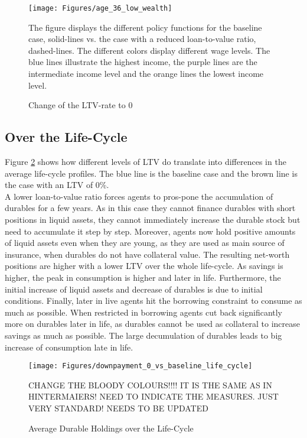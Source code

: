 \documentclass[a4paper,12pt,legno]{article}
\begin{document}
\begin{figure}[!htbp]
\caption{Change of the LTV-rate to $0$} 
\label{policy_downpayment0_age36}	%
\centering
\texttt{[image: Figures/age\_36\_low\_wealth]}  %

\begin{minipage}{0.8\linewidth}
\footnotesize{The figure displays the different policy functions for the baseline case, solid-lines vs. the case with a reduced loan-to-value ratio, dashed-lines. The different colors display different wage levels. The blue lines illustrate the highest income, the purple lines are the intermediate income level and the orange lines the lowest income level.}
\end{minipage}

\end{figure}

\subsection{Over the Life-Cycle}
Figure \ref{downpayment_vs_baseline_lc} shows how different levels of LTV do translate into differences in the average life-cycle profiles. The blue line is the baseline case and the brown line is the case with an LTV of 0\%. \\ A lower loan-to-value ratio forces agents to  pros-pone the accumulation of durables for a few years. As in this case they cannot finance durables with short positions in liquid assets, they cannot immediately increase the durable stock but need to accumulate it step by step. Moreover, agents now hold positive amounts of liquid assets even when they are young, as they are used as main source of insurance, when durables do not have collateral value. The resulting net-worth positions are higher with a lower LTV over the whole life-cycle. As savings is higher, the peak in consumption is higher and later in life.
Furthermore, the initial increase of liquid assets and decrease of durables is due to initial conditions. Finally, later in live agents hit the borrowing constraint to consume as much as possible. When restricted in borrowing agents cut back significantly more on durables later in life, as durables cannot be used as collateral to increase savings as much as possible. The large decumulation of durables leads to big increase of consumption late in life. 


\begin{figure}[!htbp]
\caption{Average Durable Holdings over the Life-Cycle} 
\label{downpayment_vs_baseline_lc}	%
\centering
\texttt{[image: Figures/downpayment\_0\_vs\_baseline\_life\_cycle]}  %

\begin{minipage}{0.8\linewidth}
\footnotesize{CHANGE THE BLOODY COLOURS!!!! IT IS THE SAME AS IN HINTERMAIERS! NEED TO INDICATE THE MEASURES. JUST VERY STANDARD! NEEDS TO BE UPDATED}
\end{minipage}

\end{figure}
\end{document}

